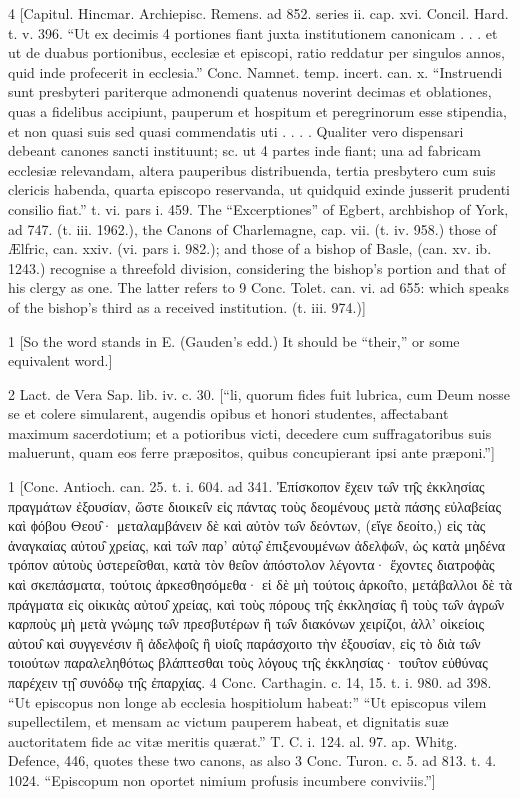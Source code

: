 4
[Capitul. Hincmar. Archiepisc. Remens. ad 852. series ii. cap. xvi. Concil. Hard. t. v. 396. “Ut ex decimis 4 portiones fiant juxta institutionem canonicam . . . et ut de duabus portionibus, ecclesiæ et episcopi, ratio reddatur per singulos annos, quid inde profecerit in ecclesia.” Conc. Namnet. temp. incert. can. x. “Instruendi sunt presbyteri pariterque admonendi quatenus noverint decimas et oblationes, quas a fidelibus accipiunt, pauperum et hospitum et peregrinorum esse stipendia, et non quasi suis sed quasi commendatis uti . . . . Qualiter vero dispensari debeant canones sancti instituunt; sc. ut 4 partes inde fiant; una ad fabricam ecclesiæ relevandam, altera pauperibus distribuenda, tertia presbytero cum suis clericis habenda, quarta episcopo reservanda, ut quidquid exinde jusserit prudenti consilio fiat.” t. vi. pars i. 459. The “Excerptiones” of Egbert, archbishop of York, ad 747. (t. iii. 1962.), the Canons of Charlemagne, cap. vii. (t. iv. 958.) those of Ælfric, can. xxiv. (vi. pars i. 982.); and those of a bishop of Basle, (can. xv. ib. 1243.) recognise a threefold division, considering the bishop’s portion and that of his clergy as one. The latter refers to 9 Conc. Tolet. can. vi. ad 655: which speaks of the bishop’s third as a received institution. (t. iii. 974.)]

1
[So the word stands in E. (Gauden’s edd.) It should be “their,” or some equivalent word.]

2
Lact. de Vera Sap. lib. iv. c. 30. [“li, quorum fides fuit lubrica, cum Deum nosse se et colere simularent, augendis opibus et honori studentes, affectabant maximum sacerdotium; et a potioribus victi, decedere cum suffragatoribus suis maluerunt, quam eos ferre præpositos, quibus concupierant ipsi ante præponi.”]

1
[Conc. Antioch. can. 25. t. i. 604. ad 341. Ἐπίσκοπον ἔχειν τω̑ν τη̑ς ἐκκλησίας πραγμάτων ἐξουσίαν, ὥστε διοικει̑ν εἰς πάντας τοὺς δεομένους μετὰ πάσης εὐλαβείας καὶ ϕόβου Θεου̑· μεταλαμβάνειν δὲ καὶ αὐτὸν τω̑ν δεόντων, (εἴγε δεοίτο,) εἰς τὰς ἀναγκαίας αὐτου̑ χρείας, καὶ τω̑ν παρ’ αὐτῳ̑ ἐπιξενουμένων ἀδελϕω̑ν, ὡς κατὰ μηδένα τρόπον αὐτοὺς ὑστερει̑σθαι, κατὰ τὸν θει̑ον ἀπόστολον λέγοντα· ἔχοντες διατροϕὰς καὶ σκεπάσματα, τούτοις ἀρκεσθησόμεθα· εἰ δὲ μὴ τούτοις ἀρκοι̑το, μετάβαλλοι δὲ τὰ πράγματα εἰς οἰκικὰς αὐτου̑ χρείας, καὶ τοὺς πόρους τη̑ς ἐκκλησίας ἢ τοὺς τω̑ν ἀγρω̑ν καρποὺς μὴ μετὰ γνώμης τω̑ν πρεσβυτέρων ἢ τω̑ν διακόνων χειρίζοι, ἀλλ’ οἰκείοις αὐτου̑ καὶ συγγενέσιν ἢ ἀδελϕοι̑ς ἢ υἱοι̑ς παράσχοιτο τὴν ἐξουσίαν, εἰς τὸ διὰ τω̑ν τοιούτων παραλεληθότως βλάπτεσθαι τοὺς λόγους τη̑ς ἐκκλησίας· του̑τον εὐθύνας παρέχειν τῃ̑ συνόδῳ τη̑ς ἐπαρχίας. 4 Conc. Carthagin. c. 14, 15. t. i. 980. ad 398. “Ut episcopus non longe ab ecclesia hospitiolum habeat:” “Ut episcopus vilem supellectilem, et mensam ac victum pauperem habeat, et dignitatis suæ auctoritatem fide ac vitæ meritis quærat.” T. C. i. 124. al. 97. ap. Whitg. Defence, 446, quotes these two canons, as also 3 Conc. Turon. c. 5. ad 813. t. 4. 1024. “Episcopum non oportet nimium profusis incumbere conviviis.”]

